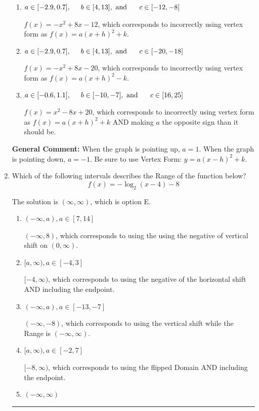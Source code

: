 \documentclass{extbook}[14pt]
\newcommand{\litem}[1]{\item #1

\rule{\textwidth}{0.4pt}}
\begin{document}
\begin{enumerate}
{\begin{enumerate}[label=\Alph*.]
* $f(x)=-x^{2} -8 x -12$, which is the correct option.
\item \( a \in [-2.9, 0.7], \hspace*{5mm} b \in [4, 13], \text{ and } \hspace*{5mm} c \in [-12, -8] \)

$f(x)=-x^{2} +8 x -12$, which corresponds to incorrectly using vertex form as $f(x) = a(x+h)^2+k$.
\item \( a \in [-2.9, 0.7], \hspace*{5mm} b \in [4, 13], \text{ and } \hspace*{5mm} c \in [-20, -18] \)

$f(x)=-x^{2} +8 x -20$, which corresponds to incorrectly using vertex form as $f(x) = a(x+h)^2 - k$.
\item \( a \in [-0.6, 1.1], \hspace*{5mm} b \in [-10, -7], \text{ and } \hspace*{5mm} c \in [16, 25] \)

$f(x)=x^{2} -8 x + 20$, which corresponds to incorrectly using vertex form as $f(x) = a(x+h)^2+k$ AND making $a$ the opposite sign than it should be.
\end{enumerate}

\textbf{General Comment:} When the graph is pointing up, $a=1$. When the graph is pointing down, $a=-1$. Be sure to use Vertex Form: $y = a(x-h)^2+k$.
}
\litem{
Which of the following intervals describes the Range of the function below?
\[ f(x) = -\log_2{(x-4)}-8 \]

The solution is \( (\infty, \infty) \), which is option E.\begin{enumerate}[label=\Alph*.]
\item \( (-\infty, a), a \in [7, 14] \)

$(-\infty, 8)$, which corresponds to using the using the negative of vertical shift on $(0, \infty)$.
\item \( [a, \infty), a \in [-4, 3] \)

$[-4, \infty)$, which corresponds to using the negative of the horizontal shift AND including the endpoint.
\item \( (-\infty, a), a \in [-13, -7] \)

$(-\infty, -8)$, which corresponds to using the vertical shift while the Range is $(-\infty, \infty)$.
\item \( [a, \infty), a \in [-2, 7] \)

$[-8, \infty)$, which corresponds to using the flipped Domain AND including the endpoint.
\item \( (-\infty, \infty) \)


\end{enumerate}}
\end{enumerate}
\end{document}
